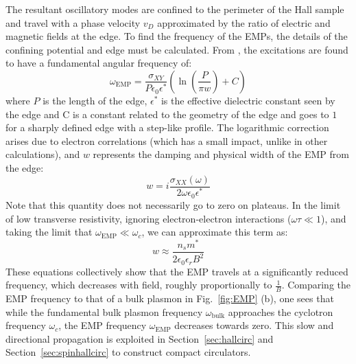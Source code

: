 The resultant oscillatory modes are confined to the perimeter of the Hall sample and travel with a phase velocity $v_D$ approximated by the ratio
of electric and magnetic fields at the edge. To find the frequency of the EMPs, the details of the confining potential and edge must be calculated.
From \cite{1988ZhETF..94..217V}, the excitations are found to have a fundamental angular frequency of:
\begin{equation}
  \omega_{\textrm{EMP}} = \frac{\sigma_{XY}}{P\epsilon_0\epsilon^*}\left(\ln\left(\frac{P}{\pi w}\right) + C\right)
\end{equation}
where $P$ is the length of the edge, $\epsilon^*$ is the effective dielectric constant seen by the edge and C is a constant related to the geometry of the edge and goes to $1$ for a sharply defined edge with a step-like profile. The logarithmic correction arises due to electron correlations (which has a small impact,
unlike in other calculations), and $w$ represents the damping and physical width of the EMP from the edge:
\begin{equation}
  w = i\frac{\sigma_{XX}(\omega)}{2\omega\epsilon_0\epsilon^*}
\end{equation}
Note that this quantity does not necessarily go to zero on plateaus.
In the limit of low transverse resistivity, ignoring electron-electron interactions ($\omega\tau \ll 1$), and taking the limit
that $\omega_{\textrm{EMP}} \ll \omega_c$, we can approximate this term as:
\begin{equation}
  w \approx \frac{n_sm^*}{2\epsilon_0\epsilon_r B^2}
\end{equation}
These equations collectively show that the EMP travels at a significantly reduced frequency, which decreases with field, roughly proportionally to $\tfrac{1}{B}$.
Comparing the EMP frequency to that of a bulk plasmon in Fig.~\ref{fig:EMP} (b), one sees that while the fundamental bulk plasmon frequency $\omega_\textrm{bulk}$
approaches the cyclotron frequency $\omega_c$, the EMP frequency $\omega_\textrm{EMP}$ decreases towards zero. This slow and directional propagation is exploited in
Section~\ref{sec:hallcirc} and Section~\ref{sec:spinhallcirc} to construct compact circulators.

